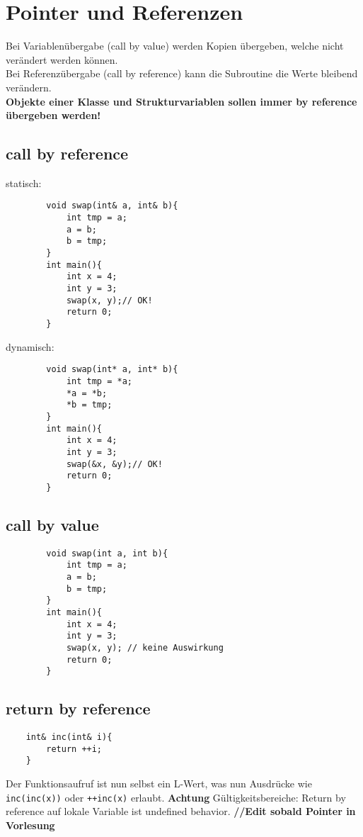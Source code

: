\section{Pointer und Referenzen} 
Bei Variablenübergabe (call by value) werden Kopien übergeben, welche nicht verändert werden können.\\
Bei Referenzübergabe (call by reference) kann die Subroutine die Werte bleibend verändern. \\
\textbf{Objekte einer Klasse und Strukturvariablen sollen immer by reference übergeben werden!} \\
\subsection{call by reference}
\vspace{-13pt}
\begin{multicols}{2}
	statisch:
	\begin{lstlisting}
		void swap(int& a, int& b){
			int tmp = a;
			a = b;
			b = tmp;
		}
		int main(){
			int x = 4;
			int y = 3;
			swap(x, y);// OK!
			return 0;
		}	
	\end{lstlisting}
	dynamisch:
	\begin{lstlisting}
		void swap(int* a, int* b){
			int tmp = *a;
			*a = *b;
			*b = tmp;
		}
		int main(){
			int x = 4;
			int y = 3;
			swap(&x, &y);// OK!
			return 0;
		}
	\end{lstlisting}
\end{multicols}
\subsection{call by value}
	\begin{lstlisting}
		void swap(int a, int b){
			int tmp = a;
			a = b;
			b = tmp;
		}
		int main(){
			int x = 4;
			int y = 3;
			swap(x, y); // keine Auswirkung
			return 0;
		}	
	\end{lstlisting}
\subsection{return by reference}
\begin{lstlisting}
	int& inc(int& i){
		return ++i;
	}	
\end{lstlisting}
Der Funktionsaufruf ist nun selbst ein L-Wert, was nun Ausdrücke wie \texttt{inc(inc(x))} oder \texttt{++inc(x)} erlaubt. \textbf{Achtung} Gültigkeitsbereiche: Return by reference auf lokale Variable ist undefined behavior.
	\textbf{//Edit sobald Pointer in Vorlesung}



